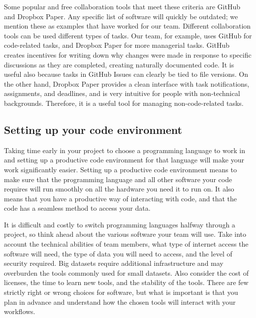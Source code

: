 \documentclass[
]{book}
\begin{document}
Some popular and free collaboration tools that meet these criteria are
GitHub and Dropbox Paper.
Any specific list of software will quickly be outdated;
we mention these as examples that have worked for our team.
Different collaboration tools can be used different types of tasks.
Our team, for example, uses GitHub for code-related tasks,
and Dropbox Paper for more managerial tasks.
GitHub creates incentives for writing down why changes were made
in response to specific discussions
as they are completed, creating naturally documented code.
It is useful also because tasks in GitHub Issues can clearly be tied to file versions.
On the other hand, Dropbox Paper provides a clean interface with task notifications,
assignments, and deadlines,
and is very intuitive for people with non-technical backgrounds.
Therefore, it is a useful tool for managing non-code-related tasks.

\hypertarget{setting-up-your-code-environment}{%
\subsection*{Setting up your code environment}\label{setting-up-your-code-environment}}

Taking time early in your project to choose a programming language to work in and
setting up a productive code environment for that language
will make your work significantly easier.
Setting up a productive code environment means to
make sure that the programming language and all other software your code requires
will run smoothly on all the hardware you need it to run on.
It also means that you have a productive way of interacting with code,
and that the code has a seamless method to access your data.

It is difficult and costly to switch programming languages halfway through a project,
so think ahead about the various software your team will use.
Take into account the technical abilities of team members,
what type of internet access the software will need,
the type of data you will need to access,
and the level of security required.
Big datasets require additional infrastructure and may overburden
the tools commonly used for small datasets.
Also consider the cost of licenses, the time to learn new tools,
and the stability of the tools.
There are few strictly right or wrong choices for software,
but what is important is that you plan in advance
and understand how the chosen tools will interact with your workflows.
\end{document}
